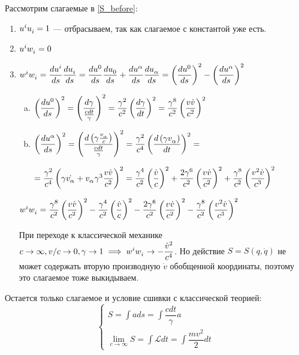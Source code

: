 \documentclass{article}
\begin{document}
Рассмотрим слагаемые в \eqref{S_before}:
\begin{enumerate}
    \item 
    $\tensor{u}{^i}\tensor{u}{_i}=1$ --- отбрасываем, так как слагаемое с константой уже есть.
    \item
    $\tensor{u}{^i}\tensor{w}{_i}=0$
    \item
    $\tensor{w}{^i}\tensor{w}{_i}=\dfrac{d\tensor{u}{^i}}{ds}\dfrac{d\tensor{u}{_i}}{ds}=\dfrac{d\tensor{u}{^0}}{ds}\dfrac{d\tensor{u}{_0}}{ds}+\dfrac{d\tensor{u}{^\alpha}}{ds}\dfrac{d\tensor{u}{_\alpha}}{ds}=\left(\dfrac{d\tensor{u}{^0}}{ds}\right)^2-\left(\dfrac{d\tensor{u}{^\alpha}}{ds}\right)^2$
    \begin{enumerate}[a)]
    \item
    $\left(\dfrac{d\tensor{u}{^0}}{ds}\right)^2=\left(\dfrac{d\gamma}{\frac{cdt}{\gamma}}\right)^2=\dfrac{\gamma^2}{c^2}\left(\dfrac{d\gamma}{dt}\right)^2=\dfrac{\gamma^8}{c^2}\left(\dfrac{v\dot{v}}{c^2}\right)^2$
    \item
    $\left(\dfrac{d\tensor{u}{^\alpha}}{ds}\right)^2=\left(\dfrac{d\left(\gamma\frac{\tensor{v}{_\alpha}}{c}\right)}{\frac{cdt}{\gamma}}\right)^2=\dfrac{\gamma^2}{c^4}\left(\dfrac{d\left(\gamma\tensor{v}{_\alpha}\right)}{dt}\right)^2=$
    
    $=\dfrac{\gamma^2}{c^4}\left(\gamma\dot{\tensor{v}{_\alpha}}+\tensor{v}{_\alpha}\gamma^3\dfrac{v\dot{v}}{c^2}\right)^2=\dfrac{\gamma^4}{c^2}\left(\dfrac{\dot{v}}{c}\right)^2+\dfrac{2\gamma^6}{c^2}\left(\dfrac{v\dot{v}}{c^2}\right)^2+\dfrac{\gamma^8}{c^2}\left(\dfrac{v^2\dot{v}}{c^3}\right)^2$
    \end{enumerate}
    $\tensor{w}{^i}\tensor{w}{_i}=\dfrac{\gamma^8}{c^2}\left(\dfrac{v\dot{v}}{c^2}\right)^2-\dfrac{\gamma^4}{c^2}\left(\dfrac{\dot{v}}{c}\right)^2-\dfrac{2\gamma^6}{c^2}\left(\dfrac{v\dot{v}}{c^2}\right)^2-\dfrac{\gamma^8}{c^2}\left(\dfrac{v^2\dot{v}}{c^3}\right)^2$
    
    При переходе к классической механике $c\to\infty,v/c\to0,\gamma\to1 \implies \tensor{w}{^i}\tensor{w}{_i}\to-\dfrac{\dot{v}^2}{c^4}$. Но действие $S=S\left(q,\dot{q}\right)$ не может содержать вторую производную $\dot{v}$ обобщенной координаты, поэтому это слагаемое тоже выкидываем. 
\end{enumerate}

Остается только слагаемое и условие сшивки с классической теорией:
\begin{equation*}
    \begin{cases}
    S=\int ads=\int \dfrac{cdt}{\gamma}a\\ \lim_{c\to\infty}S=\int\mathscr{L}dt=\int\dfrac{mv^2}{2}dt
    \end{cases}
\end{equation*}
\end{document}
